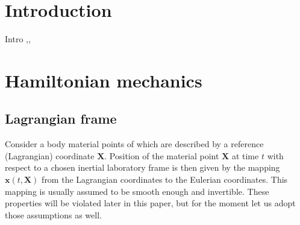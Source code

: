 \documentclass[
10pt, %
a4paper, %
oneside, %
headinclude,footinclude, %
BCOR5mm, %
]{scrartcl}
\newcommand{\xx}{\mathbf{x}}
\newcommand{\XX}{\mathbf{X}}
\begin{document}

\let\thefootnote\relax{}

\let\thefootnote\relax{}
\let\thefootnote\relax{}
\let\thefootnote\relax{}


\newpage %

\setlength\parindent{10pt} %
\setlength{\parskip}{5pt} %


\section{Introduction}

Intro 
\cite{HCO},\cite{PKG}, \cite{Markus2009}

\section{Hamiltonian mechanics}
\subsection{Lagrangian frame}
Consider a body material points of which are described by a reference (Lagrangian) coordinate $\XX$. Position of the material point $\XX$ at time $t$ with respect to a chosen inertial laboratory frame is then given by the mapping $\xx(t,\XX)$ from the Lagrangian coordinates to the Eulerian coordinates. This mapping is usually assumed to be smooth enough and invertible. These properties will be violated later in this paper, but for the moment let us adopt those assumptions as well. 
\end{document}
